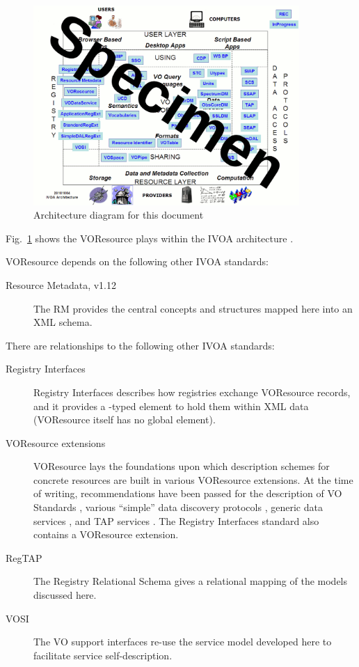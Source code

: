 \documentclass[11pt,a4paper]{ivoa}
\begin{document}
\begin{figure}
\centering

\includegraphics[width=0.9\textwidth]{archdiag.png}
\caption{Architecture diagram for this document}
\label{fig:archdiag}
\end{figure}

Fig.~\ref{fig:archdiag} shows the VOResource plays within the
IVOA architecture \citep{note:VOARCH}.

VOResource depends on the following other IVOA standards:

\begin{description}
\item[Resource Metadata, v1.12 \citep{2007ivoa.spec.0302H}] The RM
provides the central concepts and structures mapped here into an XML
schema.
\end{description}


There are relationships to the following other IVOA standards:

\begin{description}
\item[Registry Interfaces \citep{2009ivoa.spec.1104B}] Registry
Interfaces describes how registries exchange VOResource records, and it
provides a -typed element to hold them within XML
data (VOResource itself has no global element).
\item[VOResource extensions] VOResource lays the foundations upon which
description schemes for concrete resources are built in various
VOResource extensions.  At the time of writing, recommendations have
been passed for the description of VO Standards
\citep{2012ivoa.spec.0508H}, various ``simple'' data discovery protocols
\citep{2013ivoa.spec.1125P}, generic data services
\citep{2010ivoa.spec.1202P}, and TAP services
\citep{2012ivoa.spec.0827D}.  The Registry Interfaces standard also
contains a VOResource extension.
\item[RegTAP \citep{2014ivoa.spec.1208D}] The Registry Relational Schema
gives a relational mapping of the models discussed here.
\item[VOSI \citep{2011ivoa.spec.0531G}] The VO support interfaces re-use
the service model developed here to facilitate service self-description.
\end{description}
\end{document}
